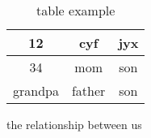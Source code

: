 \begin{table}[h!]                    %
    \centering
    \renewcommand{\arraystretch}{1.5}
    \caption{\centering table example}       %
    \begin{tabular}{c | c c}            %
        \toprule 
        12 & cyf & jyx \\
        \midrule
        34 & mom & son \\
        grandpa & father & son \\
        \bottomrule
    \end{tabular}
    \begin{tablenotes}
        \centering
        \item the relationship between us
    \end{tablenotes}
\end{table}